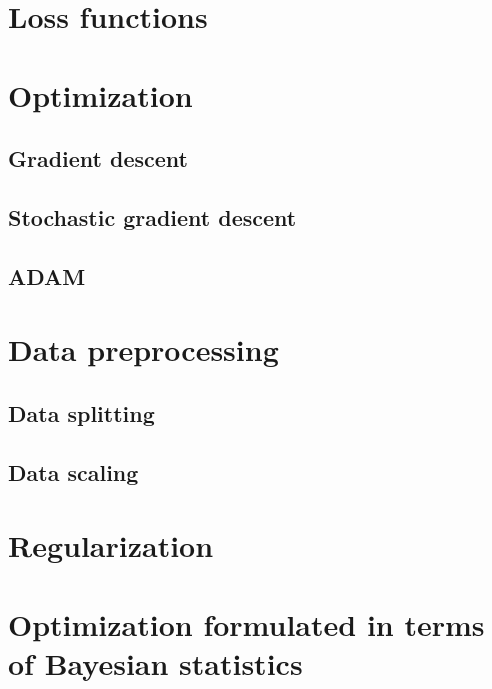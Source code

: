 \section{Loss functions}

\section{Optimization}
\subsection{Gradient descent}
\subsection{Stochastic gradient descent}
\subsection{ADAM}

\section{Data preprocessing}
\subsection{Data splitting}
\subsection{Data scaling}

\section{Regularization}
\section{Optimization formulated in terms of Bayesian statistics}